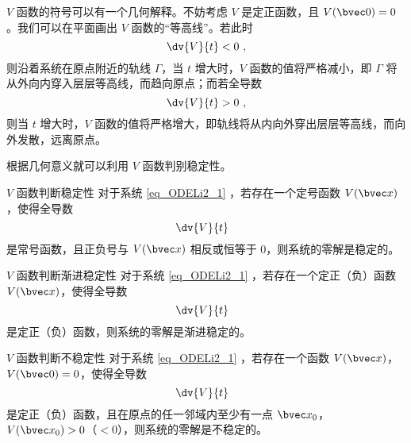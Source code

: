 $V$ 函数的符号可以有一个几何解释。不妨考虑 $V$ 是定正函数，且 $V(\bvec 0) = 0$。我们可以在平面画出 $V$ 函数的“等高线”。若此时 
\begin{equation}
\dv{V}{t} < 0 ~,
\end{equation}
则沿着系统在原点附近的轨线 $\Gamma$，当 $t$ 增大时，$V$ 函数的值将严格减小，即 $\Gamma$ 将从外向内穿入层层等高线，而趋向原点；而若全导数
\begin{equation}
\dv{V}{t} > 0 ~,
\end{equation}
则当 $t$ 增大时，$V$ 函数的值将严格增大，即轨线将从内向外穿出层层等高线，而向外发散，远离原点。

根据几何意义就可以利用 $V$ 函数判别稳定性。

\begin{theorem}{$V$ 函数判断稳定性}
对于系统 \autoref{eq_ODELi2_1} ，若存在一个定号函数 $V(\bvec x)$，使得全导数 
\begin{equation}
\dv{V}{t} ~~
\end{equation}
是常号函数，且正负号与 $V(\bvec x)$ 相反或恒等于 $0$，则系统的零解是稳定的。
\end{theorem}
\begin{theorem}{$V$ 函数判断渐进稳定性}
对于系统 \autoref{eq_ODELi2_1} ，若存在一个定正（负）函数 $V(\bvec x)$，使得全导数 
\begin{equation}
\dv{V}{t} ~~
\end{equation}
是定正（负）函数，则系统的零解是渐进稳定的。
\end{theorem}
\begin{theorem}{$V$ 函数判断不稳定性}
对于系统 \autoref{eq_ODELi2_1} ，若存在一个函数 $V(\bvec x)$，$V(\bvec 0) = 0$，使得全导数 
\begin{equation}
\dv{V}{t} ~~
\end{equation}
是定正（负）函数，且在原点的任一邻域内至少有一点 $\bvec x_0$，$V(\bvec x_0) > 0$（$<0$），则系统的零解是不稳定的。
\end{theorem}

